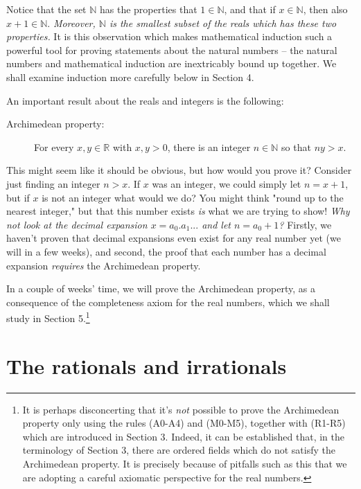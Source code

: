 \documentclass[11pt,dvipsnames]{book}
\numberwithin{figure}{section} %
\numberwithin{table}{section} %
\begin{document}
Notice that the set $\mathbb{N}$ has the properties that $1 \in \mathbb{N}$, and that if $x \in \mathbb{N}$, then also $x+1 \in \mathbb{N}$. {\em Moreover, $\mathbb{N}$ is the smallest subset of the reals which has these two properties.} It is this observation which makes mathematical induction such a powerful tool for proving statements about the natural numbers -- the natural numbers and mathematical induction are inextricably bound up together. We shall examine induction more carefully below in Section 4.

\medskip
An important result about the reals and integers is the following:

\begin{description}
\item[Archimedean property:] For every $x, y \in \mathbb{R}$ with $x,y>0$, there is an integer $n\in \mathbb{N}$ so that $ny>x$. \\
\end{description}

This might seem like it should be obvious, but how would you prove it? Consider just finding an integer $n>x$. If $x$ was an integer, we could simply let $n=x+1$, but if $x$ is not an integer what would we do? You might think "round up to the nearest integer," but that this number exists {\it is} what we are trying to show! {\it Why not look at the decimal expansion $x=a_{0}.a_{1}...$ and let $n=a_0+1$?} Firstly, we haven't proven that decimal expansions even exist for any real number yet (we will in a few weeks), and second, the proof that each number has a decimal expansion {\it requires} the Archimedean property.

In a couple of weeks' time, we will prove the Archimedean property, as a consequence of the completeness axiom for the real numbers, which we shall study in Section 5.\footnote{It is perhaps disconcerting that it's {\em not} possible to prove the Archimedean property only using the rules (A0-A4) and (M0-M5), together with (R1-R5) which are introduced in Section 3. Indeed, it can be established that, in the terminology of Section 3, there are ordered fields which do not satisfy the Archimedean property. It is precisely because of pitfalls such as this that we are adopting a careful axiomatic perspective for the real numbers.}

\section{The rationals and irrationals}
\end{document}
